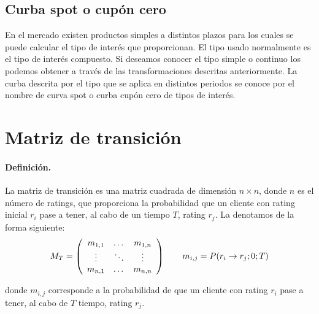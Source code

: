 \subsection{Curba spot o cup\'on cero}

En el mercado existen productos simples a distintos plazos para los cuales se 
puede calcular el tipo de inter\'es que proporcionan. El tipo usado normalmente 
es el tipo de inter\'es compuesto. Si deseamos conocer el tipo simple o continuo 
los podemos obtener a trav\'es de las transformaciones descritas anteriormente.
La curba descrita por el tipo que se aplica en distintos periodos se conoce por 
el nombre de curva spot o curba cup\'on cero de tipos de inter\'es.



\section{Matriz de transici\'on}
\label{sec:mtransition}

\paragraph{Definici\'on.} La matriz de transici\'on es una matriz cuadrada
de dimensi\'on $n \times n$, donde $n$ es el n\'umero de ratings, que 
proporciona la probabilidad que un cliente con rating inicial $r_i$ pase a 
tener, al cabo de un tiempo $T$, rating $r_j$. La denotamos de la forma 
siguiente:
\begin{displaymath}
M_T = \left(
\begin{array}{ccc}
m_{1,1} & \dots  & m_{1,n} \cr
\vdots & \ddots & \vdots \cr
m_{n,1} & \dots  & m_{n,n} 
\end{array}
\right)
\qquad
m_{i,j} = P(r_i \to r_j;0;T)
\end{displaymath}

donde $m_{i,j}$ corresponde a la probabilidad de que un cliente con rating 
$r_i$ pase a tener, al cabo de $T$ tiempo, rating $r_j$.

